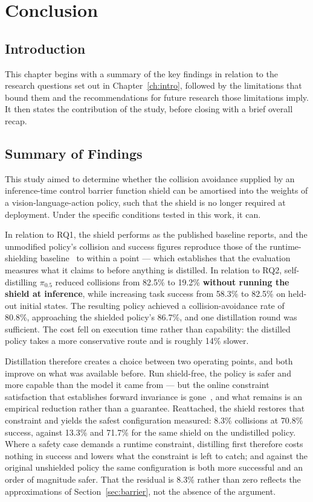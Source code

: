 
\chapter{Conclusion}\label{ch:conclusion}

\section{Introduction}\label{sec:conc:intro}

This chapter begins with a summary of the key findings in relation to the research questions set
out in Chapter~\ref{ch:intro}, followed by the limitations that bound them and the recommendations
for future research those limitations imply. It then states the contribution of the study, before
closing with a brief overall recap.

\section{Summary of Findings}\label{sec:conc:summary}

This study aimed to determine whether the collision avoidance supplied by an inference-time control
barrier function shield can be amortised into the weights of a vision-language-action policy, such
that the shield is no longer required at deployment. Under the specific conditions tested in this
work, it can.

In relation to RQ1, the shield performs as the published baseline reports, and the unmodified
policy's collision and success figures reproduce those of the runtime-shielding
baseline~\cite{vlsa2026} to within a point --- which establishes that the evaluation measures what
it claims to before anything is distilled. In relation to RQ2, self-distilling $\pi_{0.5}$ reduced collisions from 82.5\% to 19.2\% \textbf{without running the
shield at inference}, while increasing task success from 58.3\% to 82.5\% on held-out initial
states. The resulting policy achieved a collision-avoidance rate of 80.8\%, approaching the
shielded policy's 86.7\%, and one distillation round was sufficient. The cost fell on execution
time rather than capability: the distilled policy takes a more conservative route and is roughly
14\% slower.

Distillation therefore creates a choice between two operating points, and both improve on what was
available before. Run shield-free, the policy is safer and more capable than the model it came
from --- but the online constraint satisfaction that establishes forward invariance is
gone~\cite{ames2017cbf}, and what remains is an empirical reduction rather than a guarantee.
Reattached, the shield restores that constraint and yields the safest configuration measured:
8.3\% collisions at 70.8\% success, against 13.3\% and 71.7\% for the same shield on the
undistilled policy. Where a safety case demands a runtime constraint, distilling first therefore
costs nothing in success and lowers what the constraint is left to catch; and against the original
unshielded policy the same configuration is both more successful and an order of magnitude safer.
That the residual is 8.3\% rather than zero reflects the approximations of
Section~\ref{sec:barrier}, not the absence of the argument.

